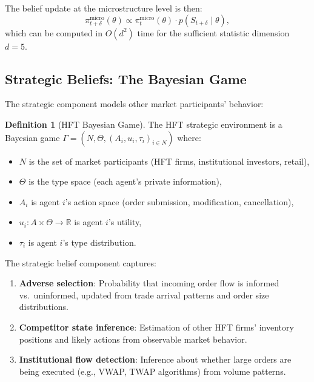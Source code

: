 \documentclass[12pt,a4paper]{article}
\theoremstyle{definition}
\newtheorem{definition}[theorem]{Definition}
\newcommand{\R}{\mathbb{R}}
\begin{document}
The belief update at the microstructure level is then:
\begin{equation}\label{eq:micro-update}
  \pi_{t+\delta}^{\mathrm{micro}}(\theta) \propto \pi_t^{\mathrm{micro}}(\theta) \cdot p(S_{t+\delta} \mid \theta),
\end{equation}
which can be computed in $O(d^2)$ time for the sufficient statistic dimension $d = 5$.

\subsection{Strategic Beliefs: The Bayesian Game}

The strategic component models other market participants' behavior:

\begin{definition}[HFT Bayesian Game]\label{def:bayesian-game}
The HFT strategic environment is a Bayesian game $\Gamma = (N, \Theta, (A_i, u_i, \tau_i)_{i \in N})$ where:
\begin{itemize}
  \item $N$ is the set of market participants (HFT firms, institutional investors, retail),
  \item $\Theta$ is the type space (each agent's private information),
  \item $A_i$ is agent $i$'s action space (order submission, modification, cancellation),
  \item $u_i: A \times \Theta \to \R$ is agent $i$'s utility,
  \item $\tau_i$ is agent $i$'s type distribution.
\end{itemize}
\end{definition}

The strategic belief component captures:
\begin{enumerate}
  \item \textbf{Adverse selection}: Probability that incoming order flow is informed vs.\ uninformed, updated from trade arrival patterns and order size distributions.

  \item \textbf{Competitor state inference}: Estimation of other HFT firms' inventory positions and likely actions from observable market behavior.

  \item \textbf{Institutional flow detection}: Inference about whether large orders are being executed (e.g., VWAP, TWAP algorithms) from volume patterns.
\end{enumerate}
\end{document}
